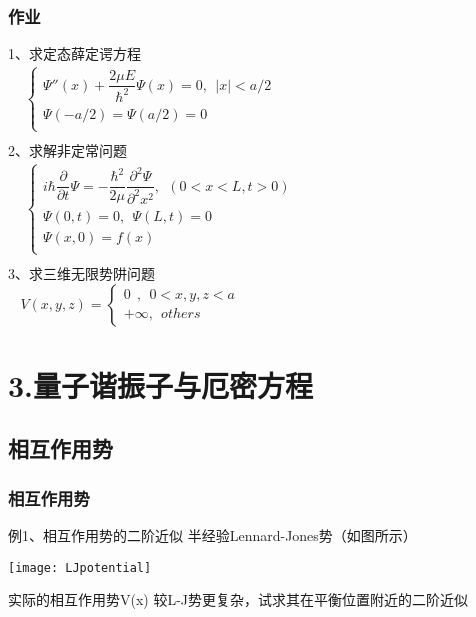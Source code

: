 \begin{frame}
	\frametitle{作业}
	1、求定态薛定谔方程\\ 
	$\begin{array}{lllllllll}
		& \begin{cases}
			\Psi'' (x) +\dfrac{2\mu E}{\hbar ^2} \Psi(x) =0,~~ |x|<a/2 \\
			\Psi(-a/2) =\Psi(a/2) =0\\
		\end{cases}\\	
	\end{array}$ \\ 
	2、求解非定常问题\\
	$\begin{array}{lllllllll}
		& \begin{cases}
			i\hbar \dfrac{\partial }{\partial t} \Psi = -\dfrac{\hbar^2}{2\mu } \dfrac{\partial ^2 \Psi }{\partial ^2  x ^2 } , ~~ (0<x<L, t>0) \\
			\Psi (0,t) =0, ~~ \Psi (L,t) =0 \\
			\Psi (x,0) =f(x)  \\
		\end{cases}\\
	\end{array}$ \\ 
	3、求三维无限势阱问题\\
	$ ~~~~	V(x,y,z)=\left \{ 
	\begin{array}{cccc}
		0	~~ ,~~ 0<x,y,z<a \\  
		+\infty ,~~others\
	\end{array}
	\right. $ 	
\end{frame}

\section{3.量子谐振子与厄密方程}

\subsection{相互作用势}

\begin{frame}
	\frametitle{相互作用势}
	\begin{exampleblock} {例1、相互作用势的二阶近似}
		半经验Lennard-Jones势（如图所示）\\
	   \centerline{\texttt{[image: LJpotential]}}  
		实际的相互作用势V(x) 较L-J势更复杂，试求其在平衡位置附近的二阶近似	
	\end{exampleblock}
\end{frame}

